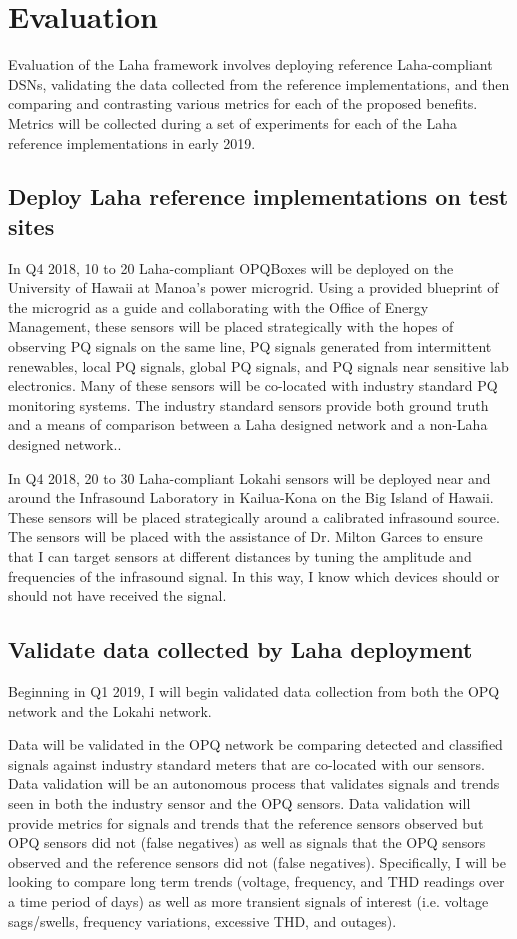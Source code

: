 \chapter{Evaluation}
Evaluation of the Laha framework involves deploying reference Laha-compliant DSNs, validating the data collected from the reference implementations, and then comparing and contrasting various metrics for each of the proposed benefits. Metrics will be collected during a set of experiments for each of the Laha reference implementations in early 2019. 

\section{Deploy Laha reference implementations on test sites}
In Q4 2018, 10 to 20 Laha-compliant OPQBoxes will be deployed on the University of Hawaii at Manoa's power microgrid. Using a provided blueprint of the microgrid as a guide and collaborating with the Office of Energy Management, these sensors will be placed strategically with the hopes of observing PQ signals on the same line, PQ signals generated from intermittent renewables, local PQ signals, global PQ signals, and PQ signals near sensitive lab electronics. Many of these sensors will be co-located with industry standard PQ monitoring systems. The industry standard sensors provide both ground truth and a means of comparison between a Laha designed network and a non-Laha designed network.. 

In Q4 2018,  20 to 30 Laha-compliant Lokahi sensors will be deployed near and around the Infrasound Laboratory in Kailua-Kona on the Big Island of Hawaii. These sensors will be placed strategically around a calibrated infrasound source. The sensors will be placed with the assistance of Dr. Milton Garces to ensure that I can target sensors at different distances by tuning the amplitude and frequencies of the infrasound signal. In this way, I know which devices should or should not have received the signal.

\section{Validate data collected by Laha deployment}
Beginning in Q1 2019, I will begin validated data collection from both the OPQ network and the Lokahi network. 

Data will be validated in the OPQ network be comparing detected and classified signals against industry standard meters that are co-located with our sensors. Data validation will be an autonomous process that validates signals and trends seen in both the industry sensor and the OPQ sensors. Data validation will provide metrics for signals and trends that the reference sensors observed but OPQ sensors did not (false negatives) as well as signals that the OPQ sensors observed and the reference sensors did not (false negatives).  Specifically, I will be looking to compare long term trends (voltage, frequency, and THD readings over a time period of days) as well as more transient signals of interest (i.e. voltage sags/swells, frequency variations, excessive THD, and outages).


